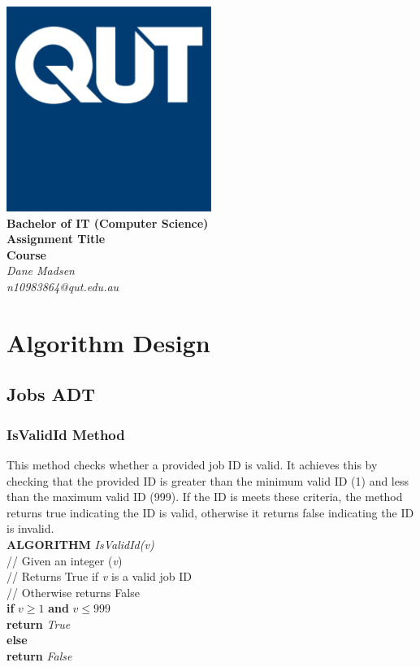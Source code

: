 \documentclass[12pt,a4paper]{article}
\begin{document}
	\begin{titlepage}
		
		\begin{center}
			\includegraphics[width=0.5\textwidth]{QUT.jpg}\\
			[0.03\textheight]  
			\Large\textbf{Bachelor of IT (Computer Science)}\\
			\Large\textbf{Assignment Title}\\
			\large\textbf{Course}\\
			[0.02\textheight]
			\large\textsl{Dane Madsen}\\
			\large\textsl{n10983864@qut.edu.au}
		\end{center}
		
	\end{titlepage}
	\tableofcontents
	\newpage
	
	\section{Algorithm Design}
		\subsection{Jobs ADT}
			\subsubsection{IsValidId Method}
				This method checks whether a provided job ID is valid. It achieves this 
				by checking that the provided ID is greater than the minimum valid ID (1) and 
				less than the maximum valid ID (999). If the ID is meets these criteria, the 
				method returns true indicating the ID is valid, otherwise it returns false 
				indicating the ID is invalid.\\
				
				\textbf{ALGORITHM} \textit{IsValidId(v)}\\
				\null\qquad\quad// Given an integer (\textit{v})\\
				\null\qquad\quad// Returns True if \textit{v} is a valid job ID\\
				\null\qquad\quad// Otherwise returns False\\
				\null\qquad\quad\textbf{if} \textit{$v \geq 1$} \textbf{and} \textit{$v \leq 999$}\\
				\null\qquad\qquad\textbf{return} \textit{True}\\
				\null\qquad\quad\textbf{else}\\
				\null\qquad\qquad\textbf{return} \textit{False}\\
\end{document}
